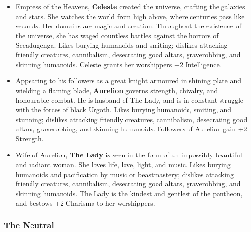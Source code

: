 \begin{itemize}
\item Empress of the Heavens, {\bf Celeste} created the universe, crafting 
the galaxies and stars.  She watches the world from high above, where 
centuries pass like seconds.  Her domains are magic and creation.  
Throughout the existence of the universe, she has waged countless battles 
against the horrors of Sceadugenga.  Likes burying humanoids and smiting; 
dislikes attacking friendly creatures, cannibalism, desecrating good altars,
graverobbing, and skinning humanoids.  Celeste grants her worshippers +2 
Intelligence.

\item Appearing to his followers as a great knight armoured in shining
plate and wielding a flaming blade, {\bf Aurelion} governs strength, 
chivalry, and honourable combat.  He is husband of The Lady, and is in 
constant struggle with the forces of black Urgoth.  Likes burying humanoids,
smiting, and stunning; dislikes attacking friendly creatures, cannibalism,
desecrating good altars, graverobbing, and skinning humanoids. Followers of 
Aurelion gain +2 Strength.

\item Wife of Aurelion, {\bf The Lady} is seen in the form of an 
impossibly beautiful and radiant woman.  She loves life, love, light, and 
music.  Likes burying humanoids and pacification by music or beastmastery;
dislikes attacking friendly creatures, cannibalism, desecrating good altars,
graverobbing, and skinning humanoids.  The Lady is the kindest and gentlest of 
the pantheon, and bestows +2 Charisma to her worshippers.
\end{itemize}

\subsubsection{The Neutral}

